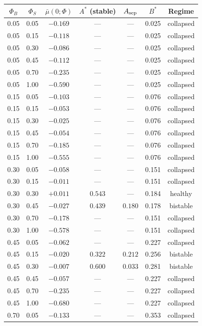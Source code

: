 \begin{tabular}{cc|ccccc}
\toprule
$\Phi_B$ & $\Phi_S$ & $\bar\mu(0;\Phi)$ & $A^*$ (stable) & $A_{\rm sep}$ & $B^*$ & Regime \\
\midrule
0.05 & 0.05 & $-0.169$ & --- & --- & 0.025 & collapsed \\
0.05 & 0.15 & $-0.118$ & --- & --- & 0.025 & collapsed \\
0.05 & 0.30 & $-0.086$ & --- & --- & 0.025 & collapsed \\
0.05 & 0.45 & $-0.112$ & --- & --- & 0.025 & collapsed \\
0.05 & 0.70 & $-0.235$ & --- & --- & 0.025 & collapsed \\
0.05 & 1.00 & $-0.590$ & --- & --- & 0.025 & collapsed \\
0.15 & 0.05 & $-0.103$ & --- & --- & 0.076 & collapsed \\
0.15 & 0.15 & $-0.053$ & --- & --- & 0.076 & collapsed \\
0.15 & 0.30 & $-0.025$ & --- & --- & 0.076 & collapsed \\
0.15 & 0.45 & $-0.054$ & --- & --- & 0.076 & collapsed \\
0.15 & 0.70 & $-0.185$ & --- & --- & 0.076 & collapsed \\
0.15 & 1.00 & $-0.555$ & --- & --- & 0.076 & collapsed \\
0.30 & 0.05 & $-0.058$ & --- & --- & 0.151 & collapsed \\
0.30 & 0.15 & $-0.011$ & --- & --- & 0.151 & collapsed \\
0.30 & 0.30 & $+0.011$ & $0.543$ & --- & 0.184 & healthy \\
0.30 & 0.45 & $-0.027$ & $0.439$ & $0.180$ & 0.178 & bistable \\
0.30 & 0.70 & $-0.178$ & --- & --- & 0.151 & collapsed \\
0.30 & 1.00 & $-0.578$ & --- & --- & 0.151 & collapsed \\
0.45 & 0.05 & $-0.062$ & --- & --- & 0.227 & collapsed \\
0.45 & 0.15 & $-0.020$ & $0.322$ & $0.212$ & 0.256 & bistable \\
0.45 & 0.30 & $-0.007$ & $0.600$ & $0.033$ & 0.281 & bistable \\
0.45 & 0.45 & $-0.057$ & --- & --- & 0.227 & collapsed \\
0.45 & 0.70 & $-0.235$ & --- & --- & 0.227 & collapsed \\
0.45 & 1.00 & $-0.680$ & --- & --- & 0.227 & collapsed \\
0.70 & 0.05 & $-0.133$ & --- & --- & 0.353 & collapsed \\

\end{tabular}
